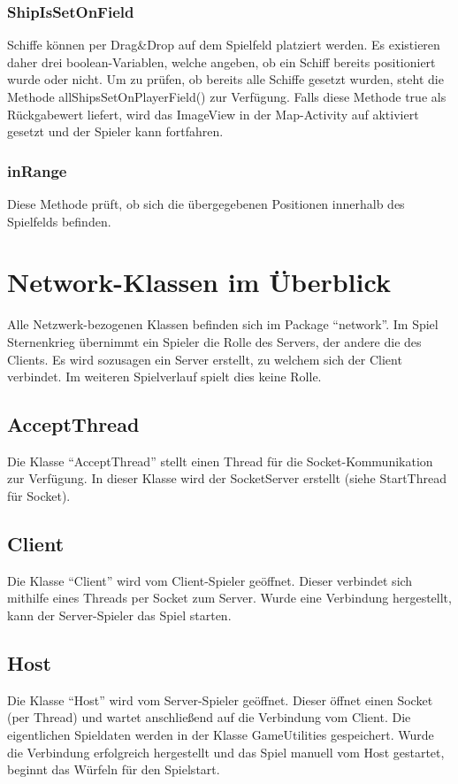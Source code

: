 \documentclass[11pt]{article} %
\begin{document}
\subsubsection{ShipIsSetOnField}
Schiffe können per Drag\&Drop auf dem Spielfeld platziert werden. Es existieren daher drei boolean-Variablen, welche angeben, ob ein Schiff bereits positioniert wurde oder nicht. Um zu prüfen, ob bereits alle Schiffe gesetzt wurden, steht die Methode allShipsSetOnPlayerField() zur Verfügung. Falls diese Methode true als Rückgabewert liefert, wird das ImageView in der Map-Activity auf aktiviert gesetzt und der Spieler kann fortfahren.

\subsubsection{inRange}
Diese Methode prüft, ob sich die übergegebenen Positionen innerhalb des Spielfelds befinden.

\section{Network-Klassen im Überblick}
Alle Netzwerk-bezogenen Klassen befinden sich im Package \enquote{network}. Im Spiel Sternenkrieg übernimmt ein Spieler die Rolle des Servers, der andere die des Clients. Es wird sozusagen ein Server erstellt, zu welchem sich der Client verbindet. Im weiteren Spielverlauf spielt dies keine Rolle.

\subsection{AcceptThread}
Die Klasse \enquote{AcceptThread} stellt einen Thread für die Socket-Kommunikation zur Verfügung. In dieser Klasse wird der SocketServer erstellt (siehe StartThread für Socket).

\subsection{Client}
Die Klasse \enquote{Client} wird vom Client-Spieler geöffnet. Dieser verbindet sich mithilfe eines Threads per Socket zum Server. Wurde eine Verbindung hergestellt, kann der Server-Spieler das Spiel starten.

\subsection{Host}
Die Klasse \enquote{Host} wird vom Server-Spieler geöffnet. Dieser öffnet einen Socket (per Thread) und wartet anschließend auf die Verbindung vom Client. Die eigentlichen Spieldaten werden in der Klasse GameUtilities gespeichert.
Wurde die Verbindung erfolgreich hergestellt und das Spiel manuell vom Host gestartet, beginnt das Würfeln für den Spielstart.
\end{document}

